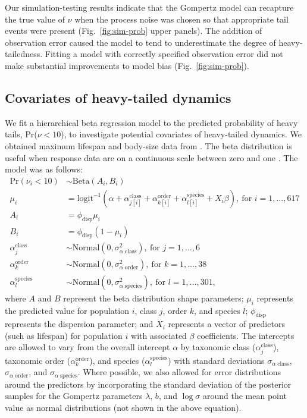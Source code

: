 Our simulation-testing results indicate that the Gompertz model can recapture
the true value of \(\nu\) when the process noise was chosen so that appropriate
tail events were present (Fig.~\ref{fig:sim-prob} upper panels). The addition
of observation error caused the model to tend to underestimate the degree of
heavy-tailedness. Fitting a model with correctly specified observation error
did not make substantial improvements to model bias (Fig.~\ref{fig:sim-prob}).

\subsection{Covariates of heavy-tailed dynamics} We fit a hierarchical beta
regression model to the predicted probability of heavy tails, Pr(\(\nu < 10\)),
to investigate potential covariates of heavy-tailed dynamics. We obtained
maximum lifespan and body-size data from \citet{brook2006a}.
The beta distribution is useful when response data are on a continuous scale
between zero and one \citep{ferrari2004}. The model was as follows:
\begin{align}
\mathrm{Pr}(\nu_i < 10) &\sim \mathrm{Beta}(A_i, B_i)\\
\mu_i &= \mathrm{logit}^{-1}(\alpha
  + \alpha^\mathrm{class}_{j[i]}
  + \alpha^\mathrm{order}_{k[i]}
  + \alpha^\mathrm{species}_{l[i]}
  + X_i \beta),
  \: \text{for } i = 1, \dots, 617\\
A_i &= \phi_\mathrm{disp} \mu_i\\
B_i &= \phi_\mathrm{disp} (1 - \mu_i)\\
\alpha^\mathrm{class}_j &\sim
  \mathrm{Normal}(0, \sigma^2_{\alpha \; \mathrm{class}}),
  \: \text{for } j = 1, \dots, 6\\
\alpha^\mathrm{order}_k &\sim
  \mathrm{Normal}(0, \sigma^2_{\alpha \; \mathrm{order}}),
  \: \text{for } k = 1, \dots, 38\\
\alpha^\mathrm{species}_l &\sim
  \mathrm{Normal}(0, \sigma^2_{\alpha \; \mathrm{species}}),
  \: \text{for } l = 1, \dots, 301,
\end{align}
where \(A\) and \(B\) represent the beta distribution shape parameters;
\(\mu_i\) represents the predicted value for population \(i\), class \(j\),
order \(k\), and species \(l\); \(\phi_\mathrm{disp}\) represents the
dispersion parameter; and \(X_i\) represents a vector of predictors (such as
lifespan) for population \(i\) with associated \(\beta\) coefficients. The
intercepts are allowed to vary from the overall intercept \(\alpha\) by
taxonomic class (\(\alpha^\mathrm{class}_j\)), taxonomic order
(\(\alpha^\mathrm{order}_k\)), and species (\(\alpha^\mathrm{species}_l\)) with
standard deviations \(\sigma_{\alpha \; \mathrm{class}}\), \(\sigma_{\alpha \;
\mathrm{order}}\), and \(\sigma_{\alpha \; \mathrm{species}}\). Where possible,
we also allowed for error distributions around the predictors by incorporating
the standard deviation of the posterior samples for the Gompertz parameters
\(\lambda\), \(b\), and \(\log \sigma\) around the mean point value as normal
distributions (not shown in the above equation).

